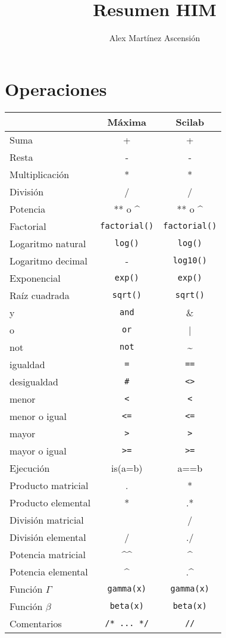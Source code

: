 \documentclass[a4paper]{article}
\title{\Huge{\vspace{-1em}Resumen HIM}}
\author{\Large{\vspace{-1em}Alex Mart\'inez Ascensi\'on}}
\begin{document}
	\maketitle

\section{Operaciones}
 \centering
\begin{tabular}{lcc}
	& Máxima & Scilab \\ \midrule
	Suma & + & +\\
	Resta & - & -\\
	Multiplicación & * & * \\
	División & / & / \\
	Potencia & ** o \^{} & ** o \^{} \\ \midrule
	Factorial & \verb|factorial()| & \verb|factorial()|\\
	Logaritmo natural & \verb|log()| & \verb|log()|\\
	Logaritmo decimal & - & \verb|log10()| \\
	Exponencial & \verb|exp()| & \verb|exp()| \\
	Raíz cuadrada & \verb|sqrt()| &\verb|sqrt()| \\ \midrule
	y & \verb|and| & \& \\
	o & \verb|or| & | \\
	not & \verb|not| & \~{} \\ \midrule
	igualdad & \verb|=| & \verb|==|\\
	desigualdad & \verb|#| & \verb|<>|\\
	menor & \verb|<| & \verb|<|\\
	menor o igual & \verb|<=| & \verb|<=|\\
	mayor & \verb|>| & \verb|>|\\
	mayor o igual & \verb|>=| & \verb|>=|\\
	Ejecución & is(a=b) & a==b\\ \midrule
	Producto matricial & . & * \\
	Producto elemental & * & .* \\
	División matricial &  & / \\
	División elemental & / & ./ \\
	Potencia matricial & \^{}\^{} & \^{} \\
	Potencia elemental & \^{} & .\^{} \\ \midrule
	Función $\Gamma$ & \verb|gamma(x)| & \verb|gamma(x)|\\
	Función $\beta$ & \verb|beta(x)| & \verb|beta(x)|\\ \midrule
	Comentarios & \verb!/* ... */! & \verb!//! \\ 
\end{tabular}
\end{document}
